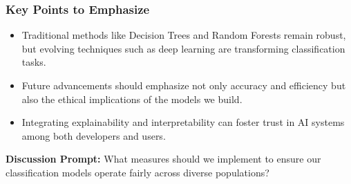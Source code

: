 \documentclass[aspectratio=169]{beamer}
\begin{document}
\begin{frame}[fragile]
    \frametitle{Key Points to Emphasize}
    \begin{itemize}
        \item Traditional methods like Decision Trees and Random Forests remain robust, but evolving techniques such as deep learning are transforming classification tasks.
        \item Future advancements should emphasize not only accuracy and efficiency but also the ethical implications of the models we build.
        \item Integrating explainability and interpretability can foster trust in AI systems among both developers and users.
    \end{itemize}

    \textbf{Discussion Prompt:} What measures should we implement to ensure our classification models operate fairly across diverse populations?
\end{frame}
\end{document}
